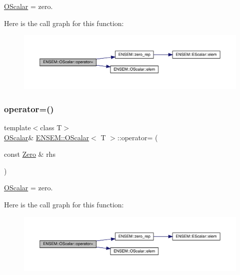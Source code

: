 \mbox{\hyperlink{classENSEM_1_1OScalar}{O\+Scalar}} = zero. 

Here is the call graph for this function\+:
\nopagebreak
\begin{figure}[H]
\begin{center}
\leavevmode
\includegraphics[width=350pt]{da/d80/classENSEM_1_1OScalar_a4fdfed29e219b358e05588826e672932_cgraph}
\end{center}
\end{figure}
\mbox{\label{classENSEM_1_1OScalar_a4fdfed29e219b358e05588826e672932}} 
\subsubsection{\texorpdfstring{operator=()}{operator=()}\hspace{0.1cm}{\footnotesize\ttfamily [4/8]}}
{\footnotesize\ttfamily template$<$class T$>$ \\
\mbox{\hyperlink{classENSEM_1_1OScalar}{O\+Scalar}}\& \mbox{\hyperlink{classENSEM_1_1OScalar}{E\+N\+S\+E\+M\+::\+O\+Scalar}}$<$ T $>$\+::operator= (\begin{DoxyParamCaption}\item[{const \mbox{\hyperlink{structENSEM_1_1Zero}{Zero}} \&}]{rhs }\end{DoxyParamCaption})\hspace{0.3cm}{\ttfamily [inline]}}



\mbox{\hyperlink{classENSEM_1_1OScalar}{O\+Scalar}} = zero. 

Here is the call graph for this function\+:
\nopagebreak
\begin{figure}[H]
\begin{center}
\leavevmode
\includegraphics[width=350pt]{da/d80/classENSEM_1_1OScalar_a4fdfed29e219b358e05588826e672932_cgraph}
\end{center}
\end{figure}
\mbox{\label{classENSEM_1_1OScalar_a7c36649387edf21f3fa19f9ae63d4aca}} 
